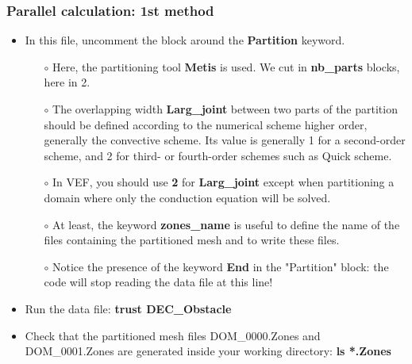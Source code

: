 \documentclass[10pt, hyperref={unicode=true,pdfusetitle, bookmarks=true,bookmarksnumbered=false,bookmarksopen=false, breaklinks=false,pdfborder={0 0 1},backref=true,colorlinks=true,linkcolor=darkblue,pageanchor}]{beamer}
\begin{document}
\begin{frame}
\frametitle{Parallel calculation: 1st method}
\begin{block}{}

\begin{itemize}
\item In this file, uncomment the block around the \textbf{Partition} keyword.
    \begin{itemize}
    \item [$\circ$] Here, the partitioning tool \textbf{Metis} is used. We cut in \textbf{nb\_parts} blocks, here in 2.
    \item [$\circ$] The overlapping width \textbf{Larg\_joint} between two parts of the partition should be defined according to the numerical scheme higher order, generally the convective scheme. Its value is generally 1 for a second-order scheme, and 2 for third- or fourth-order schemes such as Quick scheme.
    \item [$\circ$] In VEF, you should use \textbf{2} for \textbf{Larg\_joint} except when partitioning a domain where only the conduction equation will be solved.
    \item [$\circ$] At least, the keyword \textbf{zones\_name} is useful to define the name of the files containing the partitioned mesh and to write these files.
    \item [$\circ$] Notice the presence of the keyword \textbf{End} in the "Partition" block: the code will stop reading the data file at this line!
    \end{itemize}

\item Run the data file: \textbf{trust DEC\_Obstacle}

\item Check that the partitioned mesh files DOM\_0000.Zones and DOM\_0001.Zones are generated inside your working directory: \textbf{ls *.Zones}
\end{itemize}

\end{block}
\end{frame}
\end{document}
